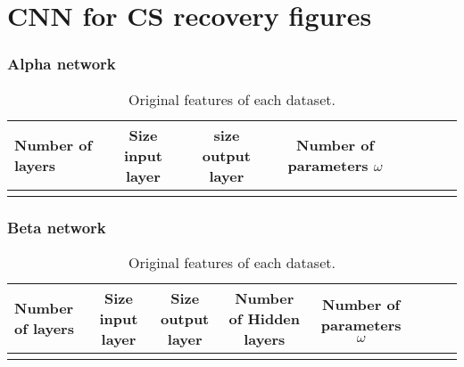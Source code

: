 \appendix
\chapter{CNN for CS recovery figures}

\subsection{Alpha network}
\begin{table}[tb]
\caption[Details of $\alpha$ Network]{Original features of each dataset.}
\label{tab:AlphaNetpar}
\centering
\begin{tabular}{l*{6}{c}r}
Number of layers & Size input layer & size output layer & Number of parameters $\omega$\\
\hline
   &  &  &  &  \\
\bottomrule 
\end{tabular}  
\end{table}

\subsection{Beta network}

\begin{table}[tb]
\caption[Details of $\beta$ Network]{Original features of each dataset.}
\label{tab:BetaNetpar}
\centering
\begin{tabular}{l*{6}{c}r}
Number of layers & Size input layer & Size output layer & Number of Hidden layers & Number of parameters $\omega$\\
\hline
   &  &  &  &  \\
\bottomrule 
\end{tabular}  
\end{table}

